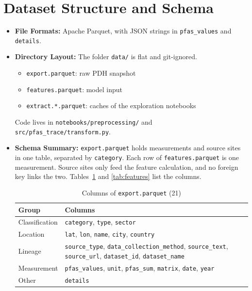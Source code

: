 \documentclass[11pt, a4paper]{article}
\newcommand{\code}[1]{\texttt{#1}}
\begin{document}
\section{Dataset Structure and Schema}
\begin{itemize}
    \item \textbf{File Formats:} Apache Parquet, with JSON strings in \code{pfas\_values} and \code{details}.
    \item \textbf{Directory Layout:} The folder \code{data/} is flat and git-ignored.
    \begin{itemize}
        \item \code{export.parquet}: raw PDH snapshot
        \item \code{features.parquet}: model input
        \item \code{extract.*.parquet}: caches of the exploration notebooks
    \end{itemize}
    Code lives in \code{notebooks/preprocessing/} and \code{src/pfas\_trace/transform.py}.
    \item \textbf{Schema Summary:} \code{export.parquet} holds measurements and source sites in one table, separated by \code{category}. Each row of \code{features.parquet} is one measurement. Source sites only feed the feature calculation, and no foreign key links the two. Tables~\ref{tab:raw} and \ref{tab:features} list the columns.

    \begin{table}[h]
        \centering
        \small
        \begin{tabularx}{\linewidth}{l X}
            \toprule
            \textbf{Group} & \textbf{Columns} \\
            \midrule
            Classification & \code{category}, \code{type}, \code{sector} \\
            Location & \code{lat}, \code{lon}, \code{name}, \code{city}, \code{country} \\
            Lineage & \code{source\_type}, \code{data\_collection\_method}, \code{source\_text}, \code{source\_url}, \code{dataset\_id}, \code{dataset\_name} \\
            Measurement & \code{pfas\_values}, \code{unit}, \code{pfas\_sum}, \code{matrix}, \code{date}, \code{year} \\
            Other & \code{details} \\
            \bottomrule
        \end{tabularx}
        \caption{Columns of \code{export.parquet} (21)}
        \label{tab:raw}
    \end{table}


\end{itemize}
\end{document}

